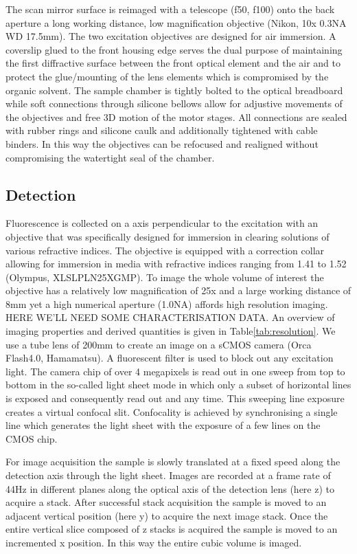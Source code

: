 \documentclass[12pt]{spieman}  %
\begin{document}
The scan mirror surface is reimaged with a telescope (f50, f100) onto the back aperture a long working distance, low magnification objective (Nikon, 10x 0.3NA WD 17.5mm). The two excitation objectives are designed for air immersion. A coverslip glued to the front housing edge serves the dual purpose of maintaining the first diffractive surface between the front optical element and the air and to protect the glue/mounting of the lens elements which is compromised by the organic solvent. The sample chamber is tightly bolted  to the optical breadboard while soft connections through silicone bellows allow for adjustive movements of the objectives and free 3D motion of the motor stages. All connections are sealed with rubber rings and silicone caulk and additionally tightened with cable binders. In this way the objectives can be refocused and realigned without compromising the watertight seal of the chamber. 

	
		\subsection{Detection}
		
		Fluorescence is collected on a axis perpendicular to the excitation with an objective that was specifically designed for immersion in clearing solutions of various refractive indices. The objective is equipped with a correction collar allowing for immersion in media with refractive indices ranging from 1.41 to 1.52 (Olympus, XLSLPLN25XGMP). To image the whole volume of interest the objective has a relatively low magnification of 25x and a large working distance of 8mm yet a high numerical aperture (1.0NA) affords high resolution imaging. HERE WE'LL NEED SOME CHARACTERISATION DATA. An overview of imaging properties and derived quantities is given in Table\ref{tab:resolution}. We use a tube lens of 200mm to create an image on a sCMOS camera (Orca Flash4.0, Hamamatsu). A fluorescent filter is used to block out any excitation light. The camera chip of over 4 megapixels is read out in one sweep from top to bottom in the so-called light sheet mode in which only a subset of horizontal lines is exposed and consequently read out and any time. This sweeping line exposure creates a virtual confocal slit. Confocality is achieved by synchronising a single line which generates the light sheet with the exposure of a few lines on the CMOS chip.
		
For image acquisition the sample is slowly translated at a fixed speed along the detection axis through the light sheet. Images are recorded at a frame rate of 44Hz in different planes along the optical axis of the detection lens (here z) to acquire a stack. After successful stack acquisition the sample is moved to an adjacent vertical position (here y) to acquire the next image stack. Once the entire vertical slice composed of z stacks is acquired the sample is moved to an incremented x position. In this way the entire cubic volume is imaged. 
	
\end{document}

